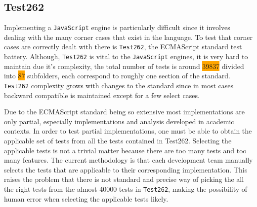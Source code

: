 \documentclass[runningheads]{llncs}
\begin{document}
\subsection{Test262}
\label{subsec:Test262}


Implementing a \texttt{JavaScript} engine is particularly difficult since it involves dealing with the many corner cases that exist in the language. To test that corner cases are correctly dealt with there is \texttt{Test262}\cite{Test262}, the ECMAScript standard test battery. Although, \texttt{Test262} is vital to the \texttt{JavaScript} engines, it is very hard to maintain due it's complexity, the total number of tests is around \colorbox{orange}{39837} divided into \colorbox{orange}{87} subfolders, each correspond to roughly one section of the standard. \texttt{Test262} complexity grows with changes to the standard since in most cases backward compatible is maintained except for a few select cases. 



Due to the ECMAScript standard being so extensive most implementations are only partial, especially implementations and analysis developed in academic contexts. In order to test partial implementations, one must be able to obtain the applicable set of tests from all the tests contained in Test262. Selecting the applicable tests is not a trivial matter because there are too many tests and too many features. The current methodology is that each development team manually selects the tests that are applicable to their corresponding implementation. This raises the problem that there is not standard and precise way of picking the all the right tests from the almost 40000 tests in \texttt{Test262}, making the possibility of human error when selecting the applicable tests likely.
\end{document}
